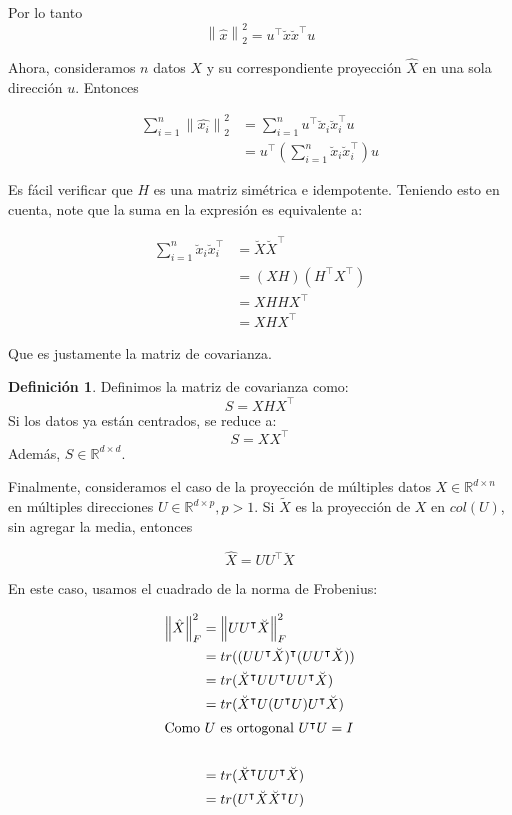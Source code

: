 \documentclass{article}
\numberwithin{equation}{section}
\theoremstyle{remark}
\theoremstyle{definition}
\newtheorem{definition}{Definición}
\theoremstyle{remark}
\theoremstyle{remark}
\begin{document}
Por lo tanto
\begin{equation}
    \label{eq:l2s_x}
    \left\| \hat{x} \right\|^2_2 =  u^\intercal \breve{x}\breve{x}^\intercal u
\end{equation}

Ahora, consideramos $n$ datos $X$ y su correspondiente proyección $\hat{X}$ en una sola dirección $u$.
Entonces

\begin{align*}
    \sum^n_{i=1} \left\| \hat{x_i} \right\|^2_2 &= \sum^n_{i=1} u^\intercal \breve{x}_i \breve{x}^\intercal_i u \\
        &= u^\intercal \left( \sum^n_{i=1} \breve{x}_i \breve{x}^\intercal_i \right) u
\end{align*}

Es fácil verificar que $H$ es una matriz simétrica e idempotente.
Teniendo esto en cuenta, note que la suma en la expresión es equivalente a:

\begin{align*}
    \sum^n_{i=1} \breve{x}_i \breve{x}^\intercal_i &= \breve{X} \breve{X}^\intercal \\
        &= (XH)(H^\intercal X^\intercal) \\
        &= XH HX^\intercal \\
        &= X H X^\intercal
\end{align*}

Que es justamente la matriz de covarianza.

\begin{definition}
    \label{df:covariance_matrix} 
    Definimos la matriz de covarianza como:
    $$S = X H X^\intercal$$
    Si los datos ya están centrados, se reduce a:
    $$S = X X^\intercal$$
    Además, $S \in \mathbb{R}^{d \times d}$.
\end{definition}

Finalmente, consideramos el caso de la proyección de múltiples datos $X \in \mathbb{R}^{d \times n}$ 
en múltiples direcciones $U \in \mathbb{R}^{d \times p}, p > 1$.
Si $\tilde{X}$ es la proyección de $X$ en $col(U)$, sin agregar la media, entonces

$$\hat{X} = U U^\intercal \breve{X}$$

En este caso, usamos el cuadrado de la norma de Frobenius:

\begin{align*}
    \left\| \hat{X} \right\|^2_F &= \left\| U U^\intercal \breve{X}  \right\|^2_F \\
        &= tr((U U^\intercal \breve{X})^\intercal (U U^\intercal \breve{X})) \\
        &= tr(\breve{X}^\intercal U U^\intercal U U^\intercal \breve{X}) \\
        &= tr(\breve{X}^\intercal U (U^\intercal U) U^\intercal \breve{X}) \\
    \intertext{Como $U$ es ortogonal $U^\intercal U = I$} \\
        &= tr(\breve{X}^\intercal U U^\intercal \breve{X}) \\
        &= tr(U^\intercal \breve{X} \breve{X}^\intercal U)
\end{align*}
\end{document}
